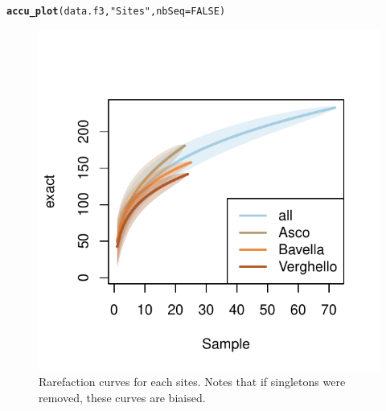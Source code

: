 \documentclass[12pt]{article}\usepackage[]{graphicx}\usepackage[]{color}
\makeatletter
\def\maxwidth{ %
  \ifdim\Gin@nat@width>\linewidth
    \linewidth
  \else
    \Gin@nat@width
  \fi
}
\newcommand{\hlnum}[1]{\textcolor[rgb]{0.686,0.059,0.569}{#1}}%
\newcommand{\hlstr}[1]{\textcolor[rgb]{0.192,0.494,0.8}{#1}}%
\newcommand{\hlstd}[1]{\textcolor[rgb]{0.345,0.345,0.345}{#1}}%
\newcommand{\hlkwc}[1]{\textcolor[rgb]{0.333,0.667,0.333}{#1}}%
\newcommand{\hlkwd}[1]{\textcolor[rgb]{0.737,0.353,0.396}{\textbf{#1}}}%
\newenvironment{kframe}{%
 \def\at@end@of@kframe{}%
 \ifinner\ifhmode%
  \def\at@end@of@kframe{\end{minipage}}%
  \begin{minipage}{\columnwidth}%
 \fi\fi%
 \def\FrameCommand##1{\hskip\@totalleftmargin \hskip-\fboxsep
 \colorbox{shadecolor}{##1}\hskip-\fboxsep
     \hskip-\linewidth \hskip-\@totalleftmargin \hskip\columnwidth}%
 \MakeFramed {\advance\hsize-\width
   \@totalleftmargin\z@ \linewidth\hsize
   \@setminipage}}%
 {\par\unskip\endMakeFramed%
 \at@end@of@kframe}
\newenvironment{knitrout}{}{} %
\numberwithin{figure}{section}
\makeatother
\begin{document}
\begin{knitrout}\small
{}\color{fgcolor}\begin{kframe}
\begin{alltt}
\hlkwd{accu_plot}\hlstd{(data.f3,} \hlstr{"Sites"}\hlstd{,} \hlkwc{nbSeq} \hlstd{=} \hlnum{FALSE}\hlstd{)}
\end{alltt}
\end{kframe}\begin{figure}

{\centering \includegraphics[width=\maxwidth]{figure/unnamed-chunk-35-1} 

}

\caption[Rarefaction curves for each sites]{Rarefaction curves for each sites. Notes that if singletons were removed, these curves are biaised.}\label{fig:unnamed-chunk-35}
\end{figure}


\end{knitrout}
\end{document}
